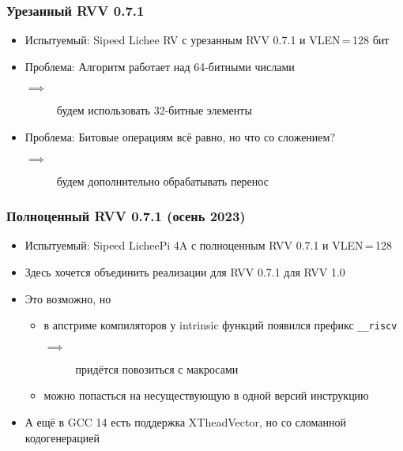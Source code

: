 \documentclass[
    aspectratio=169,
]{beamer}
\begin{document}
\begin{frame}
    \frametitle{Урезанный RVV 0.7.1}

    \begin{itemize}
        \item Испытуемый: Sipeed Lichee RV с урезанным RVV 0.7.1 и VLEN\,=\,128 бит
        \item \textcolor{solarizedRed}{Проблема}: Алгоритм работает над 64-битными числами
              \begin{description}
                  \item[\textcolor{solarizedGreen}{$\implies$}] будем использовать 32-битные элементы
              \end{description}
        \item \textcolor{solarizedRed}{Проблема}: Битовые операциям всё равно, но что со сложением?
              \begin{description}
                  \item[\textcolor{solarizedGreen}{$\implies$}] будем дополнительно обрабатывать перенос
              \end{description}
    \end{itemize}
\end{frame}

\begin{frame}
    \frametitle{Полноценный RVV 0.7.1 (осень 2023)}

    \begin{itemize}
        \item Испытуемый: Sipeed LicheePi 4A с полноценным RVV 0.7.1 и VLEN\,=\,128 %
        \item Здесь хочется объединить реализации для RVV 0.7.1 для RVV 1.0
        \item Это возможно, \textcolor{solarizedRed}{но}
              \begin{itemize}
                  \item в апстриме компиляторов у intrinsic функций появился префикс \texttt{\_\_riscv}
                        \begin{description}
                            \item[$\implies$] придётся повозиться с макросами
                        \end{description}
                  \item можно попасться на несуществующую в одной версий инструкцию
              \end{itemize}
        \item А ещё в GCC 14 есть поддержка XTheadVector, но со сломанной кодогенерацией 
    \end{itemize}

\end{frame}
\end{document}
